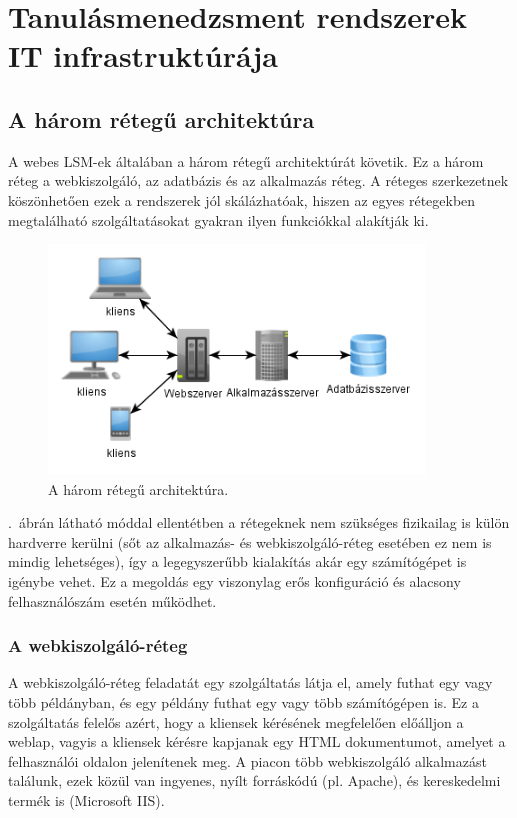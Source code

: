 \chapter{Tanulásmenedzsment rendszerek IT infrastruktúrája}
\section{A három rétegű architektúra}
A webes LSM-ek általában a három rétegű architektúrát követik. Ez a három réteg a webkiszolgáló, az adatbázis és az alkalmazás réteg. A réteges szerkezetnek köszönhetően ezek a rendszerek jól skálázhatóak, hiszen az egyes rétegekben megtalálható szolgáltatásokat gyakran ilyen funkciókkal alakítják ki.

\begin{figure}[!ht]
\centering
\includegraphics[width=100mm, keepaspectratio]{figures/3tier_simple_001.png}
\caption{A három rétegű architektúra.}
\label{fig:3tier_simple_001}
\end{figure}

.~ábrán látható móddal ellentétben a rétegeknek nem szükséges fizikailag is külön hardverre kerülni (sőt az alkalmazás- és webkiszolgáló-réteg esetében ez nem is mindig lehetséges), így a legegyszerűbb kialakítás akár egy számítógépet is igénybe vehet. Ez a megoldás egy viszonylag erős konfiguráció és alacsony felhasználószám esetén működhet.

\subsection{A webkiszolgáló-réteg}
A webkiszolgáló-réteg feladatát egy szolgáltatás látja el, amely futhat egy vagy több példányban, és egy példány futhat egy vagy több számítógépen is. Ez a szolgáltatás felelős azért, hogy a kliensek kérésének megfelelően előálljon a weblap, vagyis a kliensek kérésre kapjanak egy HTML dokumentumot, amelyet a felhasználói oldalon jelenítenek meg.
A piacon több webkiszolgáló alkalmazást találunk, ezek közül van ingyenes, nyílt forráskódú (pl. Apache), és kereskedelmi termék is (Microsoft IIS).

